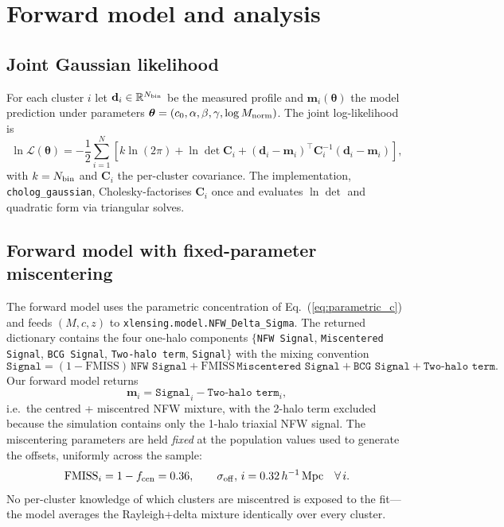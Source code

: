 \documentclass[11pt,a4paper]{article}
\newcommand{\sigmaoff}{\sigma_{\rm off}}
\newcommand{\fcen}{f_{\rm cen}}
\begin{document}
\section{Forward model and analysis}

\subsection{Joint Gaussian likelihood}

For each cluster $i$ let
$\mathbf{d}_i\in\mathbb{R}^{N_{\rm bin}}$ be the measured profile and
$\mathbf{m}_i(\boldsymbol\theta)$ the model prediction under parameters
$\boldsymbol\theta = (c_0, \alpha, \beta, \gamma, \log M_{\rm norm})$.  The
joint log-likelihood is
\begin{equation}
  \ln\mathcal{L}(\boldsymbol\theta) = -\frac{1}{2}\sum_{i=1}^N\!\left[
    k\ln(2\pi) + \ln\det\mathbf{C}_i + (\mathbf{d}_i-\mathbf{m}_i)^\top
    \mathbf{C}_i^{-1}(\mathbf{d}_i-\mathbf{m}_i)
  \right],
  \label{eq:loglike}
\end{equation}
with $k = N_{\rm bin}$ and $\mathbf{C}_i$ the per-cluster covariance.  The
implementation, \texttt{cholog\_gaussian}, Cholesky-factorises $\mathbf{C}_i$
once and evaluates $\ln\det$ and quadratic form via triangular solves.

\subsection{Forward model with fixed-parameter miscentering}

The forward model uses the parametric concentration of
Eq.~(\ref{eq:parametric_c}) and feeds $(M, c, z)$ to
\texttt{xlensing.model.NFW\_Delta\_Sigma}.  The returned dictionary contains
the four one-halo components $\{$\texttt{NFW Signal},
\texttt{Miscentered Signal}, \texttt{BCG Signal}, \texttt{Two-halo term},
\texttt{Signal}$\}$ with the mixing convention
\begin{equation}
  \texttt{Signal} = (1 - \mathrm{FMISS})\,\texttt{NFW Signal}
      + \mathrm{FMISS}\,\texttt{Miscentered Signal}
      + \texttt{BCG Signal}
      + \texttt{Two-halo term}.
  \label{eq:mixing}
\end{equation}
Our forward model returns
\begin{equation}
  \mathbf{m}_i = \texttt{Signal}_i - \texttt{Two-halo term}_i,
  \label{eq:model}
\end{equation}
i.e.\ the centred + miscentred NFW mixture, with the 2-halo term excluded
because the simulation contains only the 1-halo triaxial NFW signal.  The
miscentering parameters are held \emph{fixed} at the population values used to
generate the offsets, uniformly across the sample:
\begin{equation}
  \mathrm{FMISS}_i = 1 - \fcen = 0.36,\qquad
  \sigmaoff,\,i = 0.32\,h^{-1}\,\mathrm{Mpc} \quad\forall\,i.
\end{equation}
No per-cluster knowledge of which clusters are miscentred is exposed to the
fit—the model averages the Rayleigh+delta mixture identically over every
cluster.
\end{document}
